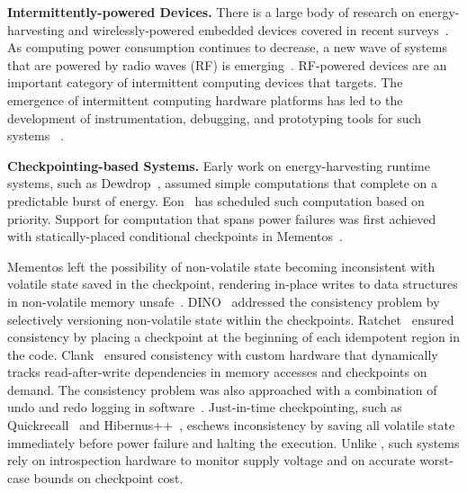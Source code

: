 \textbf{Intermittently-powered Devices.} There is a large body of research on
energy-harvesting and wirelessly-powered embedded devices covered in recent
surveys~\cite{prasad_comst_2014,sample_procieee_2013,huang:commag:2015,visser_procieee_2013,kamalinejad_commag_2015,ku_cst_2016}.
As computing power consumption continues to decrease, a new wave of
systems that are powered by radio waves (RF) is
emerging~\cite{patel_pervasive_2017,rf_powered_computing_gollakota_2014,wisp5,moo,zhao_rfid_2015,holleman_biocas_2008,thomas_jbcs_2012,naderiparizi_rfid_2015,rodriguez_tbcs_2015,liu_sigcomm_2013,kicksat,nadeau_naturebio_2017}.
RF-powered devices are an important category of intermittent computing devices
that \sys targets.  The emergence of intermittent computing hardware platforms
has led to the development of instrumentation, debugging, and prototyping tools
for such systems
~\cite{hester_sensys_2014,hester_sensys_2015,edb,capybara,stork,wisent,flicker}.

\textbf{Checkpointing-based Systems.} Early work on energy-harvesting runtime
systems, such as Dewdrop~\cite{dewdrop}, assumed simple computations
that complete on a predictable burst of energy.
Eon~\cite{sorber_sensys_2007} has scheduled such computation based on priority.
Support for computation that spans power failures was first achieved with
statically-placed conditional checkpoints in Mementos~\cite{mementos}.

Mementos left the possibility of non-volatile state becoming inconsistent with
volatile state saved in the checkpoint, rendering in-place writes to data
structures in non-volatile memory unsafe~\cite{mspcdino}.
%
DINO~\cite{dino} addressed the consistency problem by selectively versioning
non-volatile state within the checkpoints. Ratchet~\cite{ratchet} ensured
consistency by placing a checkpoint at the beginning of each idempotent region
in the code.  Clank~\cite{hicks_isca_2017} ensured consistency with custom
hardware that dynamically tracks read-after-write dependencies in memory
accesses and checkpoints on demand. The consistency problem was also
approached with a combination of undo and redo logging in
software~\cite{baghsorkhi_cgo_2018}.
%
Just-in-time checkpointing, such as Quickrecall~\cite{quickrecall} and
Hibernus++~\cite{hibernusplusplus}, eschews inconsistency by saving all
volatile state immediately before power failure and halting the execution.
Unlike \sys, such systems rely on introspection hardware to monitor supply
voltage and on accurate worst-case bounds on checkpoint cost.

